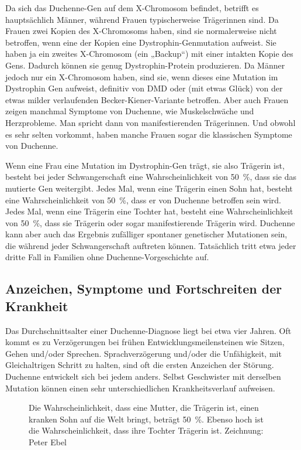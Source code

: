 \documentclass[fontsize=14pt,a4paper,headinclude,DIV=calc,automark]{scrbook}
\begin{document}
Da sich das Duchenne-Gen auf dem X-Chromosom befindet, betrifft es hauptsächlich Männer, während Frauen typischerweise Trägerinnen sind. Da Frauen zwei Kopien des X-Chromosoms haben, sind sie normalerweise nicht betroffen, wenn eine der Kopien eine Dystrophin-Genmutation aufweist. Sie haben ja ein zweites X-Chromosom (ein „Backup“) mit einer intakten Kopie des Gens. Dadurch können sie genug Dystrophin-Protein produzieren. Da Männer jedoch nur ein X-Chromosom haben, sind sie, wenn dieses eine Mutation im Dystrophin Gen aufweist, definitiv von DMD oder (mit etwas Glück) von der etwas milder verlaufenden Becker-Kiener-Variante betroffen. Aber auch Frauen zeigen manchmal Symptome von Duchenne, wie Muskelschwäche und Herzprobleme. Man spricht dann von manifestierenden Trägerinnen. Und obwohl es sehr selten vorkommt, haben manche Frauen sogar die klassischen Symptome von Duchenne.

Wenn eine Frau eine Mutation im Dystrophin-Gen trägt, sie also Trägerin ist, besteht bei jeder Schwangerschaft eine Wahrscheinlichkeit von 50 \%, dass sie das mutierte Gen weitergibt. Jedes Mal, wenn eine Trägerin einen Sohn hat, besteht eine Wahrscheinlichkeit von 50 \%, dass er von Duchenne betroffen sein wird. Jedes Mal, wenn eine Trägerin eine Tochter hat, besteht eine Wahrscheinlichkeit von 50 \%, dass sie Trägerin oder sogar manifestierende Trägerin wird. Duchenne kann aber auch das Ergebnis zufälliger spontaner genetischer Mutationen sein, die während jeder Schwangerschaft auftreten können. Tatsächlich tritt etwa jeder dritte Fall in Familien ohne Duchenne-Vorgeschichte auf.

\subsection{Anzeichen, Symptome und Fortschreiten der Krankheit}

Das Durchschnittsalter einer Duchenne-Diagnose liegt bei etwa vier Jahren. Oft kommt es zu Verzögerungen bei frühen Entwicklungsmeilensteinen wie Sitzen, Gehen und/oder Sprechen. Sprachverzögerung und/oder die Unfähigkeit, mit Gleichaltrigen Schritt zu halten, sind oft die ersten Anzeichen der Störung. Duchenne entwickelt sich bei jedem anders. Selbst Geschwister mit derselben Mutation können einen sehr unterschiedlichen Krankheitsverlauf aufweisen.

\setlength{\fboxsep}{0pt}    %
\setlength{\fboxrule}{0.2pt} %
\begin{figure}[H]
    \centering
    \caption{Die Wahrscheinlichkeit, dass eine Mutter, die Trägerin ist, einen kranken Sohn auf die Welt bringt, beträgt 50 \%. Ebenso hoch ist die Wahrscheinlichkeit, dass ihre Tochter Trägerin ist. Zeichnung: Peter Ebel}
    \label{fig:vererbung}
\end{figure}
\end{document}
